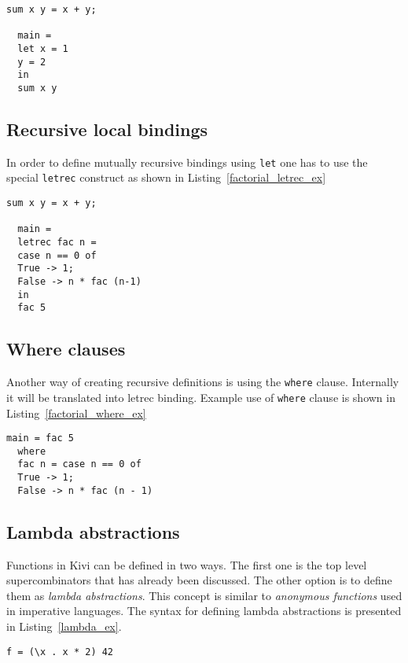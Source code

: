 \documentclass[a4paper]{report}
\begin{document}
\begin{lstlisting}[label=let_ex,caption={Local \texttt{let} binding.}]
  sum x y = x + y;

  main =
  let x = 1
  y = 2
  in
  sum x y
\end{lstlisting}

\subsection{Recursive local bindings}
In order to define mutually recursive bindings using \texttt{let} one has to use the
special \texttt{letrec} construct as shown in Listing~\ref{factorial_letrec_ex}


\begin{lstlisting}[label=factorial_letrec_ex,caption={Factorial function using \texttt{letrec}.}]
  sum x y = x + y;

  main =
  letrec fac n =
  case n == 0 of
  True -> 1;
  False -> n * fac (n-1)
  in
  fac 5
\end{lstlisting}

\subsection{Where clauses}
Another way of creating recursive definitions is using the \texttt{where}
clause. Internally it will be translated into letrec binding. Example use of
\texttt{where} clause is shown in Listing~\ref{factorial_where_ex}

\begin{lstlisting}[label=factorial_where_ex,caption={Factorial function using \texttt{where}.}]
  main = fac 5
  where
  fac n = case n == 0 of
  True -> 1;
  False -> n * fac (n - 1)
\end{lstlisting}

\subsection{Lambda abstractions}
Functions in Kivi can be defined in two ways. The first one is the top level
supercombinators that has already been discussed. The other option is to define
them as \textit{lambda abstractions}. This concept is similar to \textit{anonymous
functions} used in imperative languages. The syntax for defining lambda
abstractions is presented in Listing~\ref{lambda_ex}.

\begin{lstlisting}[label=lambda_ex,caption={Lambda abstraction}]
  f = (\x . x * 2) 42
\end{lstlisting}
\end{document}
